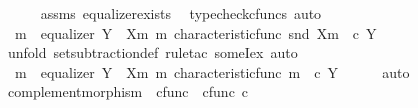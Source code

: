\begin{isabellebody}
\ \ \ \ \isamarkupfalse%
\ assms\ equalizer{\isacharunderscore}{\kern0pt}exists\ \isamarkupfalse%
\ {\isacharparenleft}{\kern0pt}typecheck{\isacharunderscore}{\kern0pt}cfuncs{\isacharcomma}{\kern0pt}\ auto{\isacharparenright}{\kern0pt}\isanewline
\ \ \isamarkupfalse%
\ \isamarkupfalse%
\ {\isachardoublequoteopen}{\isasymexists}\ m{\isacharprime}{\kern0pt}{\isachardot}{\kern0pt}\ \ equalizer\ {\isacharparenleft}{\kern0pt}Y\ {\isasymsetminus}\ {\isacharparenleft}{\kern0pt}X{\isacharcomma}{\kern0pt}m{\isacharparenright}{\kern0pt}{\isacharparenright}{\kern0pt}\ m{\isacharprime}{\kern0pt}\ {\isacharparenleft}{\kern0pt}characteristic{\isacharunderscore}{\kern0pt}func\ {\isacharparenleft}{\kern0pt}snd\ {\isacharparenleft}{\kern0pt}X{\isacharcomma}{\kern0pt}m{\isacharparenright}{\kern0pt}{\isacharparenright}{\kern0pt}{\isacharparenright}{\kern0pt}\ {\isacharparenleft}{\kern0pt}{\isasymf}\ {\isasymcirc}\isactrlsub c\ {\isasymbeta}\isactrlbsub Y\isactrlesub {\isacharparenright}{\kern0pt}{\isachardoublequoteclose}\isanewline
\ \ \ \ \isamarkupfalse%
\ {\isacharparenleft}{\kern0pt}unfold\ set{\isacharunderscore}{\kern0pt}subtraction{\isacharunderscore}{\kern0pt}def{\isacharcomma}{\kern0pt}\ rule{\isacharunderscore}{\kern0pt}tac\ someI{\isacharunderscore}{\kern0pt}ex{\isacharcomma}{\kern0pt}\ auto{\isacharparenright}{\kern0pt}\isanewline
\ \ \isamarkupfalse%
\ \isamarkupfalse%
\ {\isachardoublequoteopen}{\isasymexists}\ m{\isacharprime}{\kern0pt}{\isachardot}{\kern0pt}\ \ equalizer\ {\isacharparenleft}{\kern0pt}Y\ {\isasymsetminus}\ {\isacharparenleft}{\kern0pt}X{\isacharcomma}{\kern0pt}m{\isacharparenright}{\kern0pt}{\isacharparenright}{\kern0pt}\ m{\isacharprime}{\kern0pt}\ {\isacharparenleft}{\kern0pt}characteristic{\isacharunderscore}{\kern0pt}func\ m{\isacharparenright}{\kern0pt}\ {\isacharparenleft}{\kern0pt}{\isasymf}\ {\isasymcirc}\isactrlsub c\ {\isasymbeta}\isactrlbsub Y\isactrlesub {\isacharparenright}{\kern0pt}{\isachardoublequoteclose}\isanewline
\ \ \ \ \isamarkupfalse%
\ auto\isanewline
{}\isamarkupfalse%
%
\endisatagproof
{\isafoldproof}%
%
\isadelimproof
\isanewline
%
\endisadelimproof
\isanewline
{}\isamarkupfalse%
\ complement{\isacharunderscore}{\kern0pt}morphism\ {\isacharcolon}{\kern0pt}{\isacharcolon}{\kern0pt}\ {\isachardoublequoteopen}cfunc\ {\isasymRightarrow}\ cfunc{\isachardoublequoteclose}\ {\isacharparenleft}{\kern0pt}{\isachardoublequoteopen}{\isacharunderscore}{\kern0pt}\isactrlsup c{\isachardoublequoteclose}\ {\isacharbrackleft}{\kern0pt}{}{}{}{}{\isacharbrackright}{\kern0pt}{\isacharparenright}{\kern0pt}\ \isanewline

\end{isabellebody}
